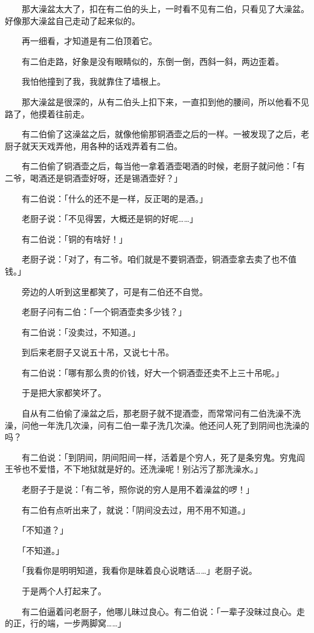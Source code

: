 \documentclass[UTF8]{ctexart}
\begin{document}
　　那大澡盆太大了，扣在有二伯的头上，一时看不见有二伯，只看见了大澡盆。好像那大澡盆自己走动了起来似的。

　　再一细看，才知道是有二伯顶着它。

　　有二伯走路，好象是没有眼睛似的，东倒一倒，西斜一斜，两边歪着。

　　我怕他撞到了我，我就靠住了墙根上。

　　那大澡盆是很深的，从有二伯头上扣下来，一直扣到他的腰间，所以他看不见路了，他摸着往前走。

　　有二伯偷了这澡盆之后，就像他偷那铜酒壶之后的一样。一被发现了之后，老厨子就天天戏弄他，用各种的话戏弄着有二伯。

　　有二伯偷了铜酒壶之后，每当他一拿着酒壶喝酒的时候，老厨子就问他：「有二爷，喝酒还是铜酒壶好呀，还是锡酒壶好？」

　　有二伯说：「什么的还不是一样，反正喝的是酒。」

　　老厨子说：「不见得罢，大概还是铜的好呢……」

　　有二伯说：「铜的有啥好！」

　　老厨子说：「对了，有二爷。咱们就是不要铜酒壶，铜酒壶拿去卖了也不值钱。」

　　旁边的人听到这里都笑了，可是有二伯还不自觉。

　　老厨子问有二伯：「一个铜酒壶卖多少钱？」

　　有二伯说：「没卖过，不知道。」

　　到后来老厨子又说五十吊，又说七十吊。

　　有二伯说：「哪有那么贵的价钱，好大一个铜酒壶还卖不上三十吊呢。」

　　于是把大家都笑坏了。

　　自从有二伯偷了澡盆之后，那老厨子就不提酒壶，而常常问有二伯洗澡不洗澡，问他一年洗几次澡，问有二伯一辈子洗几次澡。他还问人死了到阴间也洗澡的吗？

　　有二伯说：「到阴间，阴间阳间一样，活着是个穷人，死了是条穷鬼。穷鬼阎王爷也不爱惜，不下地狱就是好的。还洗澡呢！别沾污了那洗澡水。」

　　老厨子于是说：「有二爷，照你说的穷人是用不着澡盆的啰！」

　　有二伯有点听出来了，就说：「阴间没去过，用不用不知道。」

　　「不知道？」

　　「不知道。」

　　「我看你是明明知道，我看你是昧着良心说瞎话……」老厨子说。

　　于是两个人打起来了。

　　有二伯逼着问老厨子，他哪儿昧过良心。有二伯说：「一辈子没昧过良心。走的正，行的端，一步两脚窝……」
\end{document}
